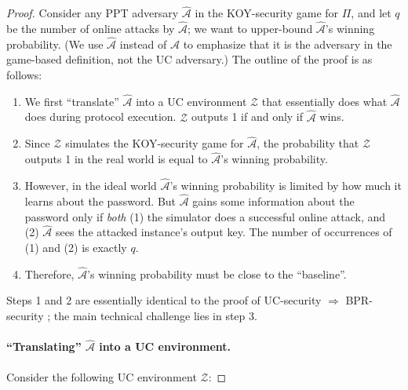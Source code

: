 \documentclass{article}
\newcommand{\adv}{\mathcal{A}}
\newcommand{\env}{\mathcal{Z}}
\begin{document}
\begin{proof}
Consider any PPT adversary $\widehat{\adv}$ in the KOY-security game for $\Pi$, and let $q$ be the number of online attacks by $\widehat{\adv}$; we want to upper-bound $\widehat{\adv}$'s winning probability. (We use $\widehat{\adv}$ instead of $\adv$ to emphasize that it is the adversary in the game-based definition, not the UC adversary.) The outline of the proof is as follows:
\begin{enumerate}
  \item We first ``translate'' $\widehat{\adv}$ into a UC environment $\env$ that essentially does what $\widehat{\adv}$ does during protocol execution. $\env$ outputs 1 if and only if $\widehat{\adv}$ wins.
  \item Since $\env$ simulates the KOY-security game for $\widehat{\adv}$, the probability that $\env$ outputs 1 in the real world is equal to $\widehat{\adv}$'s winning probability.
  \item However, in the ideal world $\widehat{\adv}$'s winning probability is limited by how much it learns about the password. But $\widehat{\adv}$ gains some information about the password only if \emph{both} (1) the simulator does a successful online attack, and (2) $\widehat{\adv}$ sees the attacked instance's output key. The number of occurrences of (1) and (2) is exactly $q$.
  \item Therefore, $\widehat{\adv}$'s winning probability must be close to the ``baseline''.
\end{enumerate}
Steps 1 and 2 are essentially identical to the proof of UC-security $\Rightarrow$ BPR-security \cite{EC:CHKLM05}; the main technical challenge lies in step 3.
\paragraph{``Translating'' $\widehat{\adv}$ into a UC environment.}
Consider the following UC environment $\env$:


\end{proof}
\end{document}
